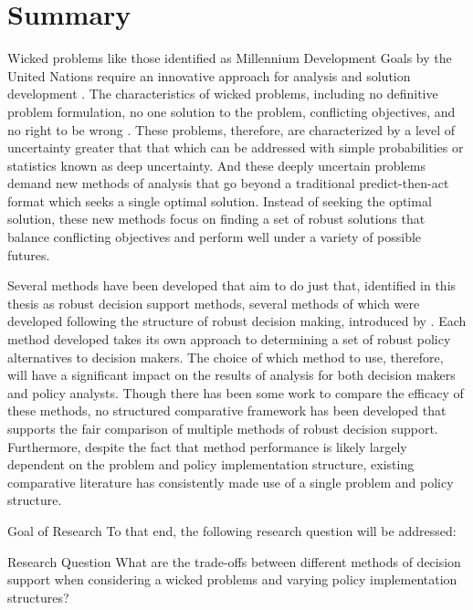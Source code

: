 \chapter{Summary}
Wicked problems like those identified as Millennium Development Goals by the United Nations require an innovative approach for analysis and solution development \citep{UnitedNations2015}. The characteristics of wicked problems, including no definitive problem formulation, no one solution to the problem, conflicting objectives, and no right to be wrong \citep{Rittel1973}. These problems, therefore, are characterized by a level of uncertainty greater that that which can be addressed with simple probabilities or statistics known as deep uncertainty. And these deeply uncertain problems demand new methods of analysis that go beyond a traditional predict-then-act format which seeks a single optimal solution. Instead of seeking the optimal solution, these new methods focus on finding a set of robust solutions that balance conflicting objectives and perform well under a variety of possible futures. 

Several methods have been developed that aim to do just that, identified in this thesis as robust decision support methods, several methods of which were developed following the structure of robust decision making, introduced by \citep{Lempert2002}. Each method developed takes its own approach to determining a set of robust policy alternatives to decision makers. The choice of which method to use, therefore, will have a significant impact on the results of analysis for both decision makers and policy analysts.  Though there has been some work to compare the efficacy of these methods, no structured comparative framework has been developed that supports the fair comparison of multiple methods of robust decision support. Furthermore, despite the fact that method performance is likely largely dependent on the problem and policy implementation structure, existing comparative literature has consistently made use of a single problem and policy structure. 

\vspace{\baselineskip}
{\Large {\color{title}Goal of Research}}
\vspace{0.5\baselineskip} \newline
To that end, the following research question will be addressed: 

\begin{researchquestion}{Research Question}
    What are the trade-offs between different methods of decision support when considering a wicked problems and varying policy implementation structures? 
\end{researchquestion}

